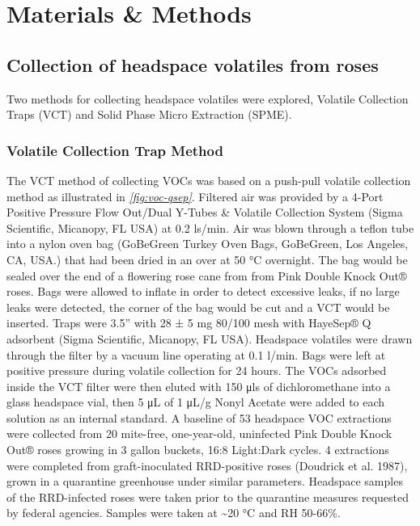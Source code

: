 \documentclass[12pt,final,CPage]{ufthesis}
\begin{document}
{  \hypertarget{mm-vocs-olfact}{%
  \section{Materials \& Methods}\label{mm-vocs-olfact}}

  \hypertarget{mm-vocs}{%
  \subsection{Collection of headspace volatiles from roses}\label{mm-vocs}}

  Two methods for collecting headspace volatiles were explored, Volatile Collection Traps (VCT) and Solid Phase Micro Extraction (SPME).

  \hypertarget{mm-vct}{%
  \subsubsection{Volatile Collection Trap Method}\label{mm-vct}}

  The VCT method of collecting VOCs was based on a push-pull volatile collection method as illustrated in \emph{\ref{fig:voc-qsep}}. Filtered air was provided by a 4-Port Positive Pressure Flow Out/Dual Y-Tubes \& Volatile Collection System (Sigma Scientific, Micanopy, FL USA) at 0.2 \si{\litre}s/min. Air was blown through a teflon tube into a nylon oven bag (GoBeGreen Turkey Oven Bags, GoBeGreen, Los Angeles, CA, USA.) that had been dried in an over at 50 °C overnight. The bag would be sealed over the end of a flowering rose cane from from Pink Double Knock Out® roses. Bags were allowed to inflate in order to detect excessive leaks, if no large leaks were detected, the corner of the bag would be cut and a VCT would be inserted. Traps were 3.5'' with 28 ± 5 \si{\milli\gram} 80/100 mesh with HayeSep® Q adsorbent (Sigma Scientific, Micanopy, FL USA). Headspace volatiles were drawn through the filter by a vacuum line operating at 0.1 \si{\litre}/min. Bags were left at positive pressure during volatile collection for 24 hours. The VOCs adsorbed inside the VCT filter were then eluted with 150 \si{\micro\litre}s of dichloromethane into a glass headspace vial, then 5 \si{\micro\liter} of 1 \si{\micro\liter}/\si{\gram} Nonyl Acetate were added to each solution as an internal standard. A baseline of 53 headspace VOC extractions were collected from 20 mite-free, one-year-old, uninfected Pink Double Knock Out® roses growing in 3 gallon buckets, 16:8 Light:Dark cycles. 4 extractions were completed from graft-inoculated RRD-positive roses (Doudrick et al. 1987), grown in a quarantine greenhouse under similar parameters. Headspace samples of the RRD-infected roses were taken prior to the quarantine measures requested by federal agencies. Samples were taken at \textasciitilde20 °C and RH 50-66\%.

}
\end{document}
